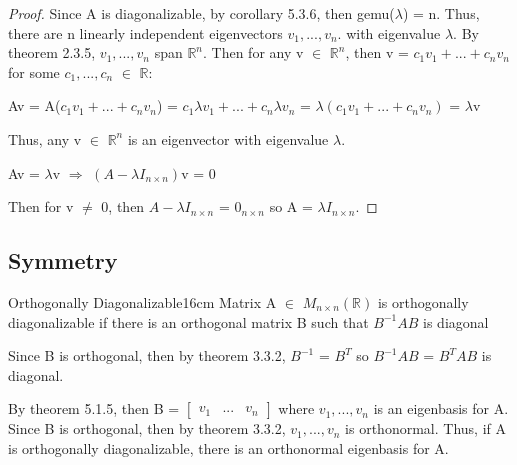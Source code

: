     \begin{proof}
        Since A is diagonalizable, by {\color{orange} corollary 5.3.6},
        then gemu($\lambda$) = n.
        Thus, there are n linearly independent eigenvectors $v_1,...,v_n$.
        with eigenvalue $\lambda$. By {\color{red} theorem 2.3.5},
        $v_1,...,v_n$ span $\mathbb{R}^n$.
        Then for any v $\in$ $\mathbb{R}^n$, then
        v = $c_1v_1 + ... + c_nv_n$ for some $c_1,...,c_n$ $\in$ $\mathbb{R}$:

        \hspace{0.5cm}
        Av
        = A($c_1v_1 + ... + c_nv_n$)
        = $c_1\lambda v_1 + ... + c_n\lambda v_n$
        = $\lambda(c_1v_1 + ... + c_nv_n)$
        = $\lambda$v

        Thus, any v $\in$ $\mathbb{R}^n$ is an eigenvector with
        eigenvalue $\lambda$.

        \hspace{0.5cm}
        Av = $\lambda$v
        \hspace{1cm}
        $\Rightarrow$
        \hspace{1cm}
        $(A - \lambda I_{n \times n})$v = 0

        Then for v $\not =$ 0, then
        $A - \lambda I_{n \times n}$ = $0_{n \times n}$
        so A = $\lambda I_{n \times n}$.
    \end{proof}

    \vspace{0.5cm}



    

\subsection{ Symmetry }

    \begin{definition}{Orthogonally Diagonalizable}{16cm}
        Matrix A $\in$ $M_{n \times n}(\mathbb{R})$ is
        {\color{lblue} orthogonally diagonalizable} if there is
        an orthogonal matrix B such that $B^{-1}AB$ is diagonal

        Since B is orthogonal, then by {\color{red} theorem 3.3.2},
        $B^{-1}$ = $B^T$ so $B^{-1}AB$ = $B^TAB$ is diagonal.

        \vspace{0.3cm}

        By {\color{red} theorem 5.1.5}, then B =
        $\begin{bmatrix}
            v_1 & ... & v_n
        \end{bmatrix}$
        where $v_1,...,v_n$ is an eigenbasis for A.
        Since B is orthogonal, then by {\color{red} theorem 3.3.2},
        $v_1,...,v_n$ is orthonormal.
        Thus, if A is orthogonally diagonalizable,
        there is an orthonormal eigenbasis for A.
    \end{definition}


